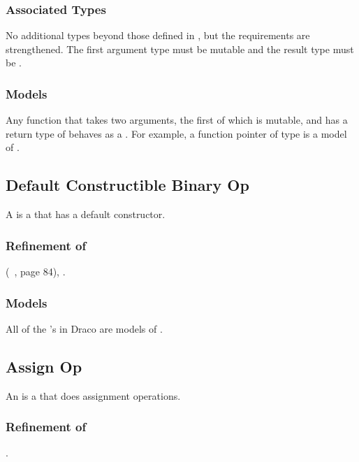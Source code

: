 \documentclass[note]{newmemo}
\begin{document}
\subsubsection{Associated Types}

No additional types beyond those defined in , 
but the requirements are strengthened. The first argument type must be 
mutable and the result type must be .

\subsubsection{Models}

Any function that takes two arguments, the first of which is mutable,
and has a return type of  behaves as a . For example, a function pointer of type  is a model of .

\bigskip

\subsection{Default Constructible Binary Op}

A  is a 
that has a default constructor.

\subsubsection{Refinement of}
 (~\cite{au99}, page 84), .

\subsubsection{Models}

All of the  's in Draco are
models of .

\newpage

\subsection{Assign Op}

An  is a 
that does assignment operations.

\subsubsection{Refinement of}
.
\end{document}
